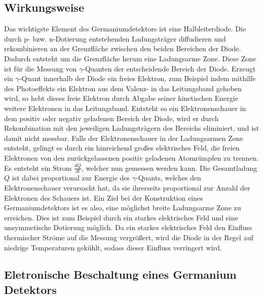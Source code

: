 \subsection{Wirkungsweise}
\label{subsec:Wirkungsweise}
Das wichtigste Element des Germaniumdetektors ist eine Halbleiterdiode.
Die durch p- bzw. n-Dotierung entstehenden Ladungsträger diffudieren und rekombinieren an der Grenzfläche zwischen den beiden Bereichen der Diode. 
Dadurch entsteht um die Grenzfläche herum eine Ladungsarme Zone.
Diese Zone ist für die Messung von $\gamma$-Quanten der entscheidende Bereich der Diode.
Erzeugt ein $\gamma$-Quant innerhalb der Diode ein freies Elektron, zum Beispiel indem mithilfe des Photoeffekts ein Elektron aus dem Valenz- in das Leitungsband gehoben wird, so hebt dieses freie Elektron durch Abgabe seiner kinetischen Energie weitere Elektronen in das Leitungsband.
Entsteht so ein Elektronenschauer in dem positiv oder negativ geladenen Bereich der Diode, wird er durch Rekombination mit den jeweiligen Ladungsträgern des Bereichs eliminiert, und ist damit nicht messbar.
Falls der Elektronenschauer in der Ladungsarmen Zone entsteht, gelingt es durch ein hinreichend großes elektrisches Feld, die freien Elektronen von den zurückgelassenen positiv geladenen Atomrümpfen zu trennen. 
Es entsteht ein Strom $\frac{dQ}{dt}$, welcher nun gemessen werden kann.
Die Gesamtladung $Q$ ist dabei proportional zur Energie des $\gamma$-Quants, welches den Elektronenschauer verursacht hat, da sie ihrerseits proportional zur Anzahl der Elektronen des Schauers ist.
Ein Ziel bei der Konstruktion eines Germaniumdetektors ist es also, eine möglichst breite Ladungsarme Zone zu erreichen.
Dies ist zum Beispiel durch ein starkes elektrisches Feld und eine unsymmetische Dotierung möglich.
Da ein starkes elektrisches Feld den Einfluss thermischer Ströme auf die Messung vergrößert, wird die Diode in der Regel auf niedrige Temperaturen gekühlt, sodass dieser Einfluss verringert wird.


\subsection{Eletronische Beschaltung eines Germanium Detektors}
\label{subsec:Eletronische Beschaltung eines Germanium Detektors}


\cite{sample}
